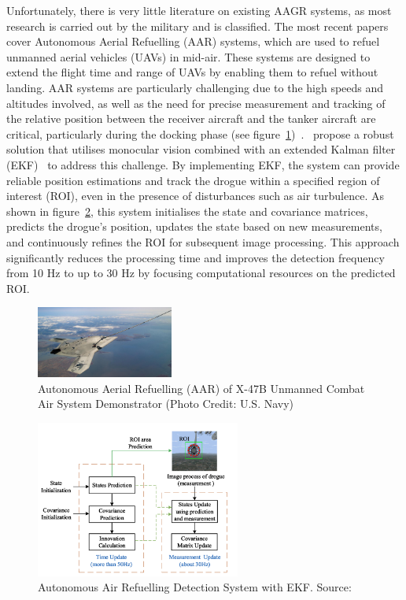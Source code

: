 \documentclass[12pt,oneside]{book} %
\begin{document}
\newpage

Unfortunately, there is very little literature on existing AAGR systems, as
most research is carried out by the military and is classified. The most recent
papers cover Autonomous Aerial Refuelling (AAR) systems, which are used to
refuel unmanned aerial vehicles (UAVs) in mid-air. These systems are designed
to extend the flight time and range of UAVs by enabling them to refuel without
landing. AAR systems are particularly challenging due to the high speeds and
altitudes involved, as well as the need for precise measurement and tracking of
the relative position between the receiver aircraft and the tanker aircraft are
critical, particularly during the docking phase (see
figure~\ref{fig:aerial-refuelling})~\cite{AARBinocularVision, AARCNN,
    Chen2011}.~\citet{AAREKF} propose a robust solution that utilises monocular
vision combined with an extended Kalman filter (EKF)~\cite{Cai2023} to address
this challenge. By implementing EKF, the system can provide reliable position
estimations and track the drogue within a specified region of interest (ROI),
even in the presence of disturbances such as air turbulence. As shown in
figure~\ref{fig:detection-system-aarekf}, this system initialises the state and
covariance matrices, predicts the drogue's position, updates the state based on
new measurements, and continuously refines the ROI for subsequent image
processing. This approach significantly reduces the processing time and
improves the detection frequency from 10 Hz to up to 30 Hz by focusing
computational resources on the predicted ROI. 

\begin{figure}[H]
    \centering
    \includegraphics[width=0.4\textwidth]{figures/x-47brefueling.jpg}
    \caption{Autonomous Aerial Refuelling (AAR) of X-47B Unmanned Combat Air System Demonstrator (Photo Credit: U.S. Navy)}\label{fig:aerial-refuelling}
\end{figure}

\begin{figure}[H]
    \centering
    \includegraphics[width=0.6\textwidth]{figures/detection_system_AAREKF.png}
    \caption{Autonomous Air Refuelling Detection System with EKF. Source: \citet{AAREKF}}\label{fig:detection-system-aarekf}
\end{figure}
\end{document}

